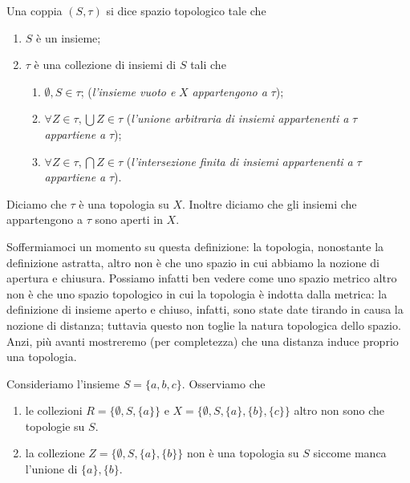 \begin{definition}
    Una coppia $(S, \tau)$ si dice spazio topologico tale che
    \begin{enumerate}[label=\protect\circled{\arabic*}]
        \item $S$ è un insieme;
        \item $\tau$ è una collezione di insiemi di $S$ tali che
        \begin{enumerate}
            \item $\emptyset, S \in \tau$; (\emph{l'insieme vuoto e } $X$ \emph{ appartengono a } $\tau$);
            \item $\forall Z \in \tau, \bigcup Z \in \tau$ (\emph{l'unione arbitraria di insiemi appartenenti a } $\tau$ \emph{ appartiene a } $\tau$);
            \item $\forall Z \in \tau, \bigcap Z \in \tau$ (\emph{l'intersezione finita di insiemi appartenenti a } $\tau$ \emph{ appartiene a } $\tau$).
        \end{enumerate}
    \end{enumerate}
    Diciamo che $\tau$ è una topologia su $X$. Inoltre diciamo che gli insiemi che appartengono a $\tau$ sono aperti in $X$. 
    \label{def:topological_space}
\end{definition}

Soffermiamoci un momento su questa definizione: la topologia, nonostante la definizione astratta, altro non è che uno spazio in cui abbiamo la nozione di apertura e chiusura. Possiamo infatti ben vedere come uno spazio metrico
altro non è che uno spazio topologico in cui la topologia è indotta dalla metrica: la definizione di insieme aperto e chiuso, infatti, sono state date tirando in causa la nozione di distanza; tuttavia questo non toglie la natura
topologica dello spazio. Anzi, più avanti mostreremo (per completezza) che una distanza induce proprio una topologia. \\
\begin{example}
    Consideriamo l'insieme $S = \{a,b,c \}$. Osserviamo che
    \begin{enumerate}[label=\protect\circled{\arabic*}]
        \item le collezioni $R = \{\emptyset, S, \{a \} \}$ e $X = \{ \emptyset, S, \{a\}, \{b\}, \{c\} \}$ altro non sono che topologie su $S$.
        \item la collezione $Z = \{\emptyset, S, \{ a \}, \{ b \} \}$ non è una topologia su $S$ siccome manca l'unione di $\{ a \}, \{ b \}$.
    \end{enumerate}
\end{example}

